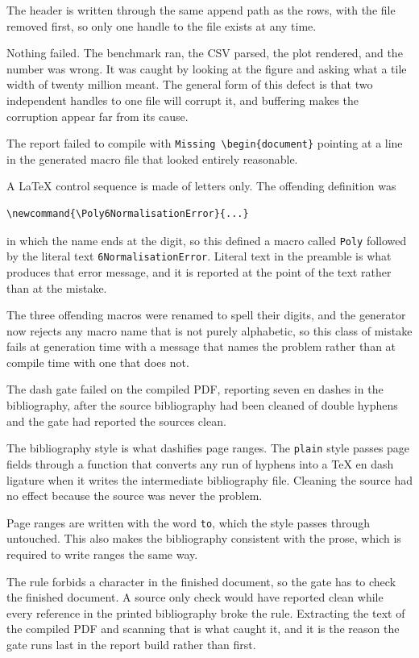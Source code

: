  The header is written through the same append path as the rows,
with the file removed first, so only one handle to the file exists at any time.

 Nothing failed. The benchmark ran, the CSV
parsed, the plot rendered, and the number was wrong. It was caught by looking
at the figure and asking what a tile width of twenty million meant. The general
form of this defect is that two independent handles to one file will corrupt
it, and buffering makes the corruption appear far from its cause.


 The report failed to compile with
\texttt{Missing \textbackslash begin\{document\}} pointing at a line in the
generated macro file that looked entirely reasonable.

 A LaTeX control sequence is made of letters only. The
offending definition was

\begin{lstlisting}
\newcommand{\Poly6NormalisationError}{...}
\end{lstlisting}

\noindent
in which the name ends at the digit, so this defined a macro called
\texttt{Poly} followed by the literal text \texttt{6NormalisationError}. Literal
text in the preamble is what produces that error message, and it is reported at
the point of the text rather than at the mistake.

 The three offending macros were renamed to spell their digits, and
the generator now rejects any macro name that is not purely alphabetic, so this
class of mistake fails at generation time with a message that names the
problem rather than at compile time with one that does not.


 The dash gate failed on the compiled PDF, reporting seven en
dashes in the bibliography, after the source bibliography had been cleaned of
double hyphens and the gate had reported the sources clean.

 The bibliography style is what dashifies page ranges. The
\texttt{plain} style passes page fields through a function that converts any
run of hyphens into a TeX en dash ligature when it writes the intermediate
bibliography file. Cleaning the source had no effect because the source was
never the problem.

 Page ranges are written with the word \texttt{to}, which the style
passes through untouched. This also makes the bibliography consistent with the
prose, which is required to write ranges the same way.

 The rule forbids a
character in the finished document, so the gate has to check the finished
document. A source only check would have reported clean while every reference
in the printed bibliography broke the rule. Extracting the text of the compiled
PDF and scanning that is what caught it, and it is the reason the gate runs
last in the report build rather than first.
